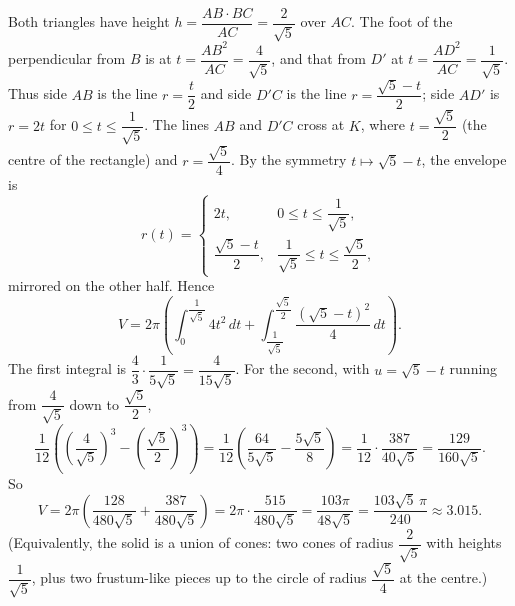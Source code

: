 Both triangles have height \(h=\dfrac{AB\cdot BC}{AC}=\dfrac{2}{\sqrt5}\) over \(AC\). The foot of the perpendicular from \(B\) is at \(t=\dfrac{AB^2}{AC}=\dfrac{4}{\sqrt5}\), and that from \(D'\) at \(t=\dfrac{AD^2}{AC}=\dfrac{1}{\sqrt5}\). Thus side \(AB\) is the line \(r=\dfrac {t}{2}\) and side \(D'C\) is the line \(r=\dfrac{\sqrt5-t}{2}\); side \(AD'\) is \(r=2t\) for \(0\le t\le\dfrac{1}{\sqrt5}\). The lines \(AB\) and \(D'C\) cross at \(K\), where \(t=\dfrac{\sqrt5}{2}\) (the centre of the rectangle) and \(r=\dfrac{\sqrt5}{4}\). By the symmetry \(t\mapsto\sqrt5-t\), the envelope is
\[
r(t)=\begin{cases}2t,&0\le t\le\dfrac{1}{\sqrt5},\\[2mm] \dfrac{\sqrt5-t}{2},&\dfrac{1}{\sqrt5}\le t\le\dfrac{\sqrt5}{2},\end{cases}
\]
mirrored on the other half. Hence
\[
V=2\pi\left(\int_0^{\dfrac{1}{\sqrt5}}4t^2\,dt+\int_{\dfrac{1}{\sqrt5}}^{\dfrac{\sqrt5}{2}}\dfrac{(\sqrt5-t)^2}{4}\,dt\right).
\]
The first integral is \(\dfrac{4}{3}\cdot\dfrac{1}{5\sqrt5}=\dfrac{4}{15\sqrt5}\). For the second, with \(u=\sqrt5-t\) running from \(\dfrac{4}{\sqrt5}\) down to \(\dfrac{\sqrt5}{2}\),
\[
\dfrac{1}{12}\left(\left(\dfrac{4}{\sqrt5}\right)^3-\left(\dfrac{\sqrt5}{2}\right)^3\right)=\dfrac{1}{12}\left(\dfrac{64}{5\sqrt5}-\dfrac{5\sqrt5}{8}\right)=\dfrac{1}{12}\cdot\dfrac{387}{40\sqrt5}=\dfrac{129}{160\sqrt5}.
\]
So
\[
V=2\pi\left(\dfrac{128}{480\sqrt5}+\dfrac{387}{480\sqrt5}\right)=2\pi\cdot\dfrac{515}{480\sqrt5}=\dfrac{103\pi}{48\sqrt5}=\boxed{\dfrac{103\sqrt5\,\pi}{240}}\approx3.015 .
\]
(Equivalently, the solid is a union of cones: two cones of radius \(\dfrac{2}{\sqrt5}\) with heights \(\dfrac{1}{\sqrt5}\), plus two frustum-like pieces up to the circle of radius \(\dfrac{\sqrt5}{4}\) at the centre.)
